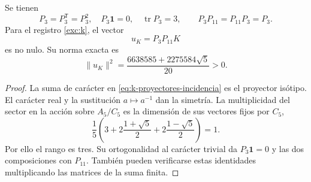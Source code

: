 \begin{lemma}
\label{lem:k-sector-no-nulo}
Se tienen
\[
 P_3=P_3^{\mathsf T}=P_3^2,\quad
 P_3\mathbf1=0,\quad \operatorname{tr}P_3=3,
 \qquad P_3P_{11}=P_{11}P_3=P_3.
\]
Para el registro \eqref{exc:k}, el vector
\begin{equation}
 u_K=P_3P_{11}K
 \label{eq:k-vector-direccional}
\end{equation}
es no nulo. Su norma exacta es
\begin{equation}
 \lVert u_K\rVert^2
 =\frac{6638585+2275584\sqrt5}{20}>0.
 \label{eq:k-norma-direccion}
\end{equation}
\end{lemma}
\begin{proof}
La suma de carácter en \eqref{eq:k-proyectores-incidencia} es el
proyector isótipo. El carácter real y la sustitución \(a\mapsto a^{-1}\)
dan la simetría. La multiplicidad del sector en la acción sobre
\(A_5/C_5\) es la dimensión de sus vectores fijos por \(C_5\),
\[
 \frac15\left(3+2\frac{1+\sqrt5}{2}
                 +2\frac{1-\sqrt5}{2}\right)=1.
\]
Por ello el rango es tres. Su ortogonalidad al carácter trivial
da \(P_3\mathbf1=0\) y las dos composiciones con \(P_{11}\).
También pueden verificarse estas identidades multiplicando las
matrices de la suma finita.


\end{proof}
